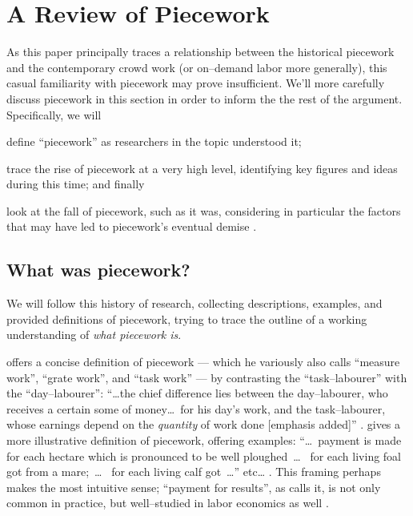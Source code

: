 \documentclass[trackingWork]{subfiles}
\begin{document}
\section{A Review of Piecework}
As this paper principally traces a relationship between
the historical piecework and the contemporary crowd work
(or on--demand labor more generally),
this casual familiarity with piecework may prove insufficient.
We'll more carefully discuss piecework in this section in order
to inform the the rest of the argument.
Specifically, we will
\begin{inlinelist}
  \item define ``piecework'' as researchers in the topic understood it;
  \item trace the rise of piecework at a very high level,
        identifying key figures and ideas during this time; and finally
  \item look at the fall of piecework, such as it was,
        considering in particular
        the factors that may have led to piecework's
        eventual demise .
\end{inlinelist}



\subsection{What was piecework?}
We will follow this history of research, collecting
descriptions,
examples, and
provided definitions of piecework, trying
to trace the outline of a working understanding of
\textit{what piecework is}.

\citeauthor{hughRaynbirdTaskWork} offers
a concise definition of piecework
--- which he variously also calls ``measure work'', ``grate work'', and ``task work'' ---
by contrasting the ``task--labourer'' with the ``day--labourer'':
``\dots the chief difference lies between the day--labourer,
who receives a certain some of money\dots~for his day's work,
and the task--labourer, whose earnings depend on the \textit{quantity} of work done [emphasis added]''
\cite{hughRaynbirdTaskWork}.
\citeauthor{10.2307/2338394} gives a more illustrative definition of piecework,
offering examples:
``\dots~payment is made for each hectare which is pronounced to be well ploughed~\dots~
for each living foal got from a mare;~\dots~
for each living calf got~\dots'' etc\dots
\cite{10.2307/2338394}.
This framing perhaps makes the most intuitive sense;
``payment for results'', as \citeauthor{10.2307/2338394} calls it,
is not only common in practice, but well--studied in labor economics as well
\cite{Figlio2007901,weitzman1976new,10.2307/3003414,BJIR:BJIR038}.
\end{document}
